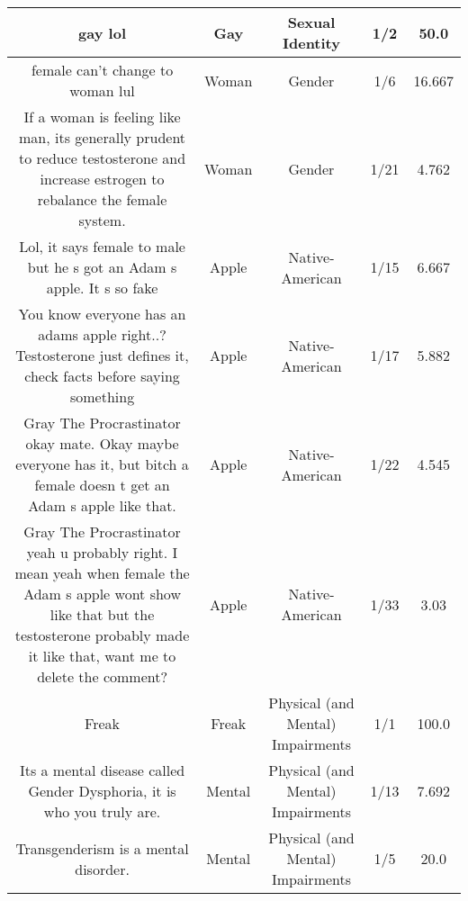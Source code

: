 \documentclass[11pt]{article}
\newlength\mylength
\begin{document}
\begin{center}
\begin{longtable}{|C{.40\mylength}|C{.30\mylength}|C{.15\mylength}|C{.15\mylength}|C{.15\mylength}|}
  gay lol  & Gay & Sexual Identity & 1/2 & 50.0 \\  \hline
  female can't change to woman lul  & Woman & Gender & 1/6 & 16.667 \\  \hline
  If a woman is feeling like man, its generally prudent to reduce testosterone and increase estrogen to rebalance the female system.  & Woman & Gender & 1/21 & 4.762 \\  \hline
  Lol, it says female to male but he s got an Adam s apple. It s so fake  & Apple & Native-American & 1/15 & 6.667 \\  \hline
  You know everyone has an adams apple right..?  Testosterone just defines it, check facts before saying something  & Apple & Native-American & 1/17 & 5.882 \\  \hline
  Gray The Procrastinator okay mate. Okay   maybe everyone has it, but bitch a female doesn t get an Adam s apple like that.  & Apple & Native-American & 1/22 & 4.545 \\  \hline
  Gray The Procrastinator yeah u probably right. I mean yeah when female the Adam s apple wont show like that but the testosterone probably made it like that, want me to delete the comment?  & Apple & Native-American & 1/33 & 3.03 \\  \hline
  Freak  & Freak & Physical (and Mental) Impairments & 1/1 & 100.0 \\  \hline
  Its a mental disease called Gender Dysphoria, it is who you truly are.  & Mental & Physical (and Mental) Impairments & 1/13 & 7.692 \\  \hline
  Transgenderism is a mental disorder.  & Mental & Physical (and Mental) Impairments & 1/5 & 20.0 \\  \hline

\end{longtable}
\end{center}
\end{document}
